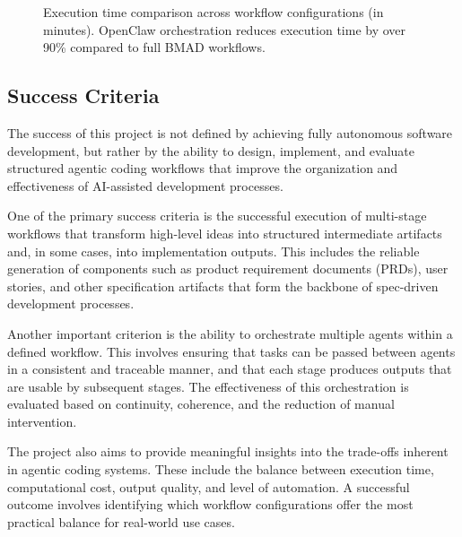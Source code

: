\documentclass[a4paper,12pt]{report}
\begin{document}
\begin{figure}[h!]
\centering
{}
\caption{Execution time comparison across workflow configurations (in minutes). OpenClaw orchestration reduces execution time by over 90\% compared to full BMAD workflows.}
\label{fig:timeComparison}
\end{figure}

\subsection{Success Criteria}
The success of this project is not defined by achieving fully autonomous software development, but rather by the ability to design, implement, and evaluate structured agentic coding workflows that improve the organization and effectiveness of AI-assisted development processes.

One of the primary success criteria is the successful execution of multi-stage workflows that transform high-level ideas into structured intermediate artifacts and, in some cases, into implementation outputs. This includes the reliable generation of components such as product requirement documents (PRDs), user stories, and other specification artifacts that form the backbone of spec-driven development processes.

Another important criterion is the ability to orchestrate multiple agents within a defined workflow. This involves ensuring that tasks can be passed between agents in a consistent and traceable manner, and that each stage produces outputs that are usable by subsequent stages. The effectiveness of this orchestration is evaluated based on continuity, coherence, and the reduction of manual intervention.

The project also aims to provide meaningful insights into the trade-offs inherent in agentic coding systems. These include the balance between execution time, computational cost, output quality, and level of automation. A successful outcome involves identifying which workflow configurations offer the most practical balance for real-world use cases.
\end{document}

